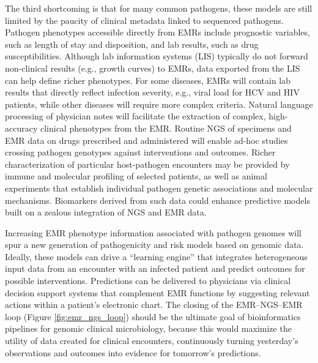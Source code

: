 The third shortcoming is that for many common pathogens, these models are still limited by the paucity of clinical metadata linked to sequenced pathogens. Pathogen phenotypes accessible directly from EMRs include prognostic variables, such as length of stay and disposition, and lab results, such as drug susceptibilities. Although lab information systems (LIS) typically do not forward non-clinical results (e.g., growth curves) to EMRs, data exported from the LIS can help define richer phenotypes. For some diseases, EMRs will contain lab results that directly reflect infection severity, e.g., viral load for HCV and HIV patients,\autocite{Norton2014} while other diseases will require more complex criteria.\autocite{DeLisle2013,Klompas2008,Silva2013} Natural language processing of physician notes will facilitate the extraction of complex, high-accuracy clinical phenotypes from the EMR.\autocite{Liao2015,Silva2013} Routine NGS of specimens and EMR data on drugs prescribed and administered will enable ad-hoc studies crossing pathogen genotypes against interventions and outcomes. Richer characterization of particular host-pathogen encounters may be provided by immune and molecular profiling of selected patients, as well as animal experiments that establish individual pathogen genetic associations and molecular mechanisms. Biomarkers derived from such data\autocite{Mejias2014,Querec2009} could enhance predictive models built on a zealous integration of NGS and EMR data.

Increasing EMR phenotype information associated with pathogen genomes will spur a new generation of pathogenicity and risk models based on genomic data. Ideally, these models can drive a “learning engine” that integrates heterogeneous input data from an encounter with an infected patient and predict outcomes for possible interventions. Predictions can be delivered to physicians via clinical decision support systems that complement EMR functions by suggesting relevant actions within a patient’s electronic chart. The closing of the EMR–NGS–EMR loop (Figure \ref{fig:emr_ngs_loop}) should be the ultimate goal of bioinformatics pipelines for genomic clinical microbiology, because this would maximize the utility of data created for clinical encounters, continuously turning yesterday’s observations and outcomes into evidence for tomorrow’s predictions.

